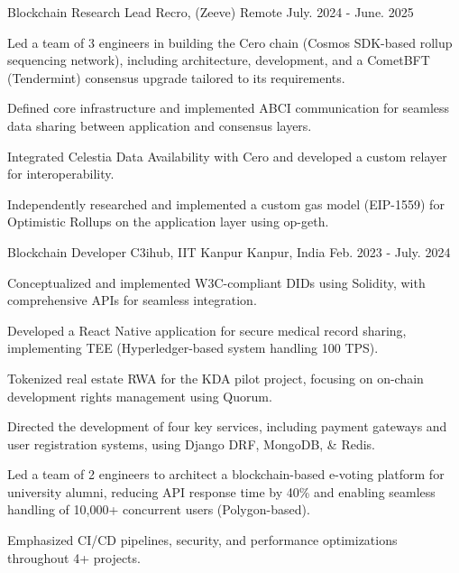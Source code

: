 \begin{cventries}
  \cventry
    {Blockchain Research Lead} %
    {Recro, (Zeeve)} %
    {Remote} %
    {July. 2024 - June. 2025} %
    {
      \begin{cvitems} %
        \item {Led a team of 3 engineers in building the Cero chain (Cosmos SDK-based rollup sequencing network), including architecture, development, and a CometBFT (Tendermint) consensus upgrade tailored to its requirements.}
        \item {Defined core infrastructure and implemented ABCI communication for seamless data sharing between application and consensus layers.}
        \item {Integrated Celestia Data Availability with Cero and developed a custom relayer for interoperability.}
        \item {Independently researched and implemented a custom gas model (EIP-1559) for Optimistic Rollups on the application layer using op-geth.}
      \end{cvitems}
    }

  \cventry
    {Blockchain Developer} %
    {C3ihub, IIT Kanpur} %
    {Kanpur, India} %
    {Feb. 2023 - July. 2024} %
    {
      \begin{cvitems} %
        \item {Conceptualized and implemented W3C-compliant DIDs using Solidity, with comprehensive APIs for seamless integration.}
        \item {Developed a React Native application for secure medical record sharing, implementing TEE (Hyperledger-based system handling 100 TPS).}
        \item {Tokenized real estate RWA for the KDA pilot project, focusing on on-chain development rights management using Quorum.}
        \item {Directed the development of four key services, including payment gateways and user registration systems, using Django DRF, MongoDB, \& Redis.}
        \item {Led a team of 2 engineers to architect a blockchain-based e-voting platform for university alumni, reducing API response time by 40\% and enabling seamless handling of 10,000+ concurrent users (Polygon-based).}
        \item {Emphasized CI/CD pipelines, security, and performance optimizations throughout 4+ projects.}
      \end{cvitems}
    }


\end{cventries}

